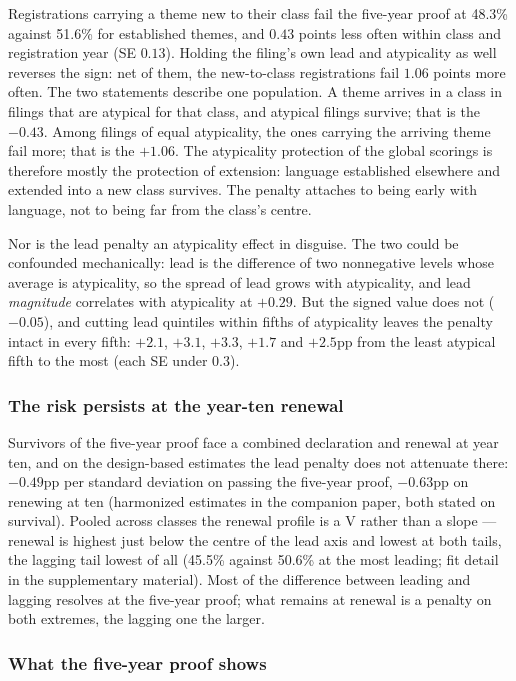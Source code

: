 Registrations carrying a theme new to their class fail the five-year proof
at 48.3\% against 51.6\% for established themes, and $0.43$ points less
often within class and registration year (SE $0.13$). Holding the
filing's own lead and atypicality as well reverses the sign: net of them,
the new-to-class registrations fail $1.06$ points more often. The two
statements describe one population. A theme arrives in a class in filings
that are atypical for that class, and atypical filings survive; that is
the $-0.43$. Among filings of equal atypicality, the ones carrying the
arriving theme fail more; that is the $+1.06$. The atypicality protection
of the global scorings is therefore mostly the protection of extension:
language established elsewhere and extended into a new class survives.
The penalty attaches to being early with language, not to being far from
the class's centre.

Nor is the lead penalty an atypicality effect in disguise. The two could
be confounded mechanically: lead is the difference of two nonnegative
levels whose average is atypicality, so the spread of lead grows with
atypicality, and lead \emph{magnitude} correlates with atypicality at
$+0.29$. But the signed value does not ($-0.05$), and cutting lead
quintiles within fifths of atypicality leaves the penalty intact in
every fifth: $+2.1$, $+3.1$, $+3.3$, $+1.7$ and $+2.5$pp from the least
atypical fifth to the most (each SE under $0.3$).

\subsubsection{The risk persists at the year-ten renewal}\label{sec:renewal}

Survivors of the five-year proof face a combined declaration and renewal
at year ten, and on the design-based estimates the lead penalty does not
attenuate there: $-0.49$pp per standard deviation on passing the
five-year proof, $-0.63$pp on renewing at ten (harmonized estimates in the companion paper,
both stated on survival). Pooled across classes the renewal profile is a
V rather than a slope --- renewal is highest just below the centre of the
lead axis and lowest at both tails, the lagging tail lowest of all
(45.5\% against 50.6\% at the most leading; fit detail in the
supplementary material). Most of the difference between leading and
lagging resolves at the five-year proof; what remains at renewal is a
penalty on both extremes, the lagging one the larger.

\subsubsection{What the five-year proof shows}\label{sec:gate_conclusion}

